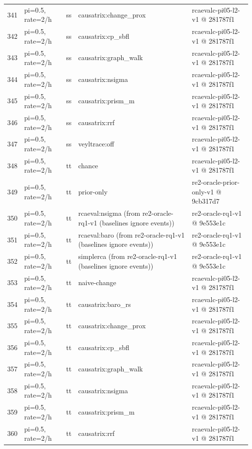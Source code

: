 \begin{longtable}{@{}r>{\raggedright\arraybackslash}p{48.0pt}>{\raggedright\arraybackslash}p{18.0pt}>{\raggedright\arraybackslash}p{108.0pt}>{\raggedright\arraybackslash}p{105.0pt}@{}}
341 & pi=0.5, rate=2/h & ss & causatrix:change\_prox & rcaevalc-pi05-l2-v1 @ 281787f1 \\
342 & pi=0.5, rate=2/h & ss & causatrix:cp\_sbfl & rcaevalc-pi05-l2-v1 @ 281787f1 \\
343 & pi=0.5, rate=2/h & ss & causatrix:graph\_walk & rcaevalc-pi05-l2-v1 @ 281787f1 \\
344 & pi=0.5, rate=2/h & ss & causatrix:nsigma & rcaevalc-pi05-l2-v1 @ 281787f1 \\
345 & pi=0.5, rate=2/h & ss & causatrix:prism\_m & rcaevalc-pi05-l2-v1 @ 281787f1 \\
346 & pi=0.5, rate=2/h & ss & causatrix:rrf & rcaevalc-pi05-l2-v1 @ 281787f1 \\
347 & pi=0.5, rate=2/h & ss & veyltrace:off & rcaevalc-pi05-l2-v1 @ 281787f1 \\
348 & pi=0.5, rate=2/h & tt & chance & rcaevalc-pi05-l2-v1 @ 281787f1 \\
349 & pi=0.5, rate=2/h & tt & prior-only & re2-oracle-prior-only-v1 @ 9cb317d7 \\
350 & pi=0.5, rate=2/h & tt & rcaeval:nsigma (from re2-oracle-rq1-v1 (baselines ignore events)) & re2-oracle-rq1-v1 @ 9e553e1c \\
351 & pi=0.5, rate=2/h & tt & rcaeval:baro (from re2-oracle-rq1-v1 (baselines ignore events)) & re2-oracle-rq1-v1 @ 9e553e1c \\
352 & pi=0.5, rate=2/h & tt & simplerca (from re2-oracle-rq1-v1 (baselines ignore events)) & re2-oracle-rq1-v1 @ 9e553e1c \\
353 & pi=0.5, rate=2/h & tt & naive-change & rcaevalc-pi05-l2-v1 @ 281787f1 \\
354 & pi=0.5, rate=2/h & tt & causatrix:baro\_rs & rcaevalc-pi05-l2-v1 @ 281787f1 \\
355 & pi=0.5, rate=2/h & tt & causatrix:change\_prox & rcaevalc-pi05-l2-v1 @ 281787f1 \\
356 & pi=0.5, rate=2/h & tt & causatrix:cp\_sbfl & rcaevalc-pi05-l2-v1 @ 281787f1 \\
357 & pi=0.5, rate=2/h & tt & causatrix:graph\_walk & rcaevalc-pi05-l2-v1 @ 281787f1 \\
358 & pi=0.5, rate=2/h & tt & causatrix:nsigma & rcaevalc-pi05-l2-v1 @ 281787f1 \\
359 & pi=0.5, rate=2/h & tt & causatrix:prism\_m & rcaevalc-pi05-l2-v1 @ 281787f1 \\
360 & pi=0.5, rate=2/h & tt & causatrix:rrf & rcaevalc-pi05-l2-v1 @ 281787f1 \\

\end{longtable}
